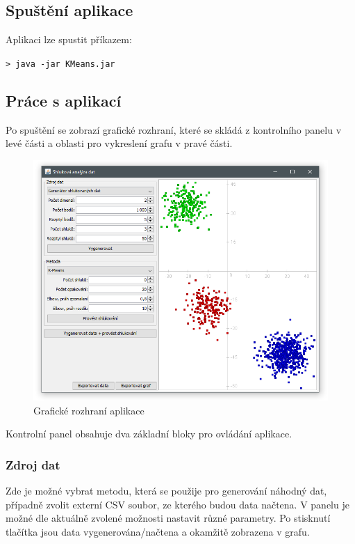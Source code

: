 \documentclass[pdftex,a4paper]{article}
\begin{document}
\subsection{Spuštění aplikace}
Aplikaci lze spustit příkazem:

\vspace{2mm}
\texttt{> java -jar KMeans.jar}


\subsection{Práce s aplikací}\label{subsec:prace-s-aplikace}
Po spuštění se zobrazí grafické rozhraní, které se skládá z kontrolního panelu v levé části a oblasti pro vykreslení grafu v pravé části.


\begin{figure}[h]
	\centering
	\includegraphics[width=1\textwidth]{res/gui.png}
	\caption{Grafické rozhraní aplikace}
	\label{fig:obr-gui}
\end{figure}


Kontrolní panel obsahuje dva základní bloky pro ovládání aplikace.

\subsubsection*{Zdroj dat}
Zde je možné vybrat metodu, která se použije pro generování náhodný dat, případně zvolit externí CSV soubor, ze kterého budou data načtena. V panelu je možné dle aktuálně zvolené možnosti nastavit různé parametry. Po stisknutí tlačítka jsou data vygenerována/načtena a okamžitě zobrazena v grafu.
\end{document}
